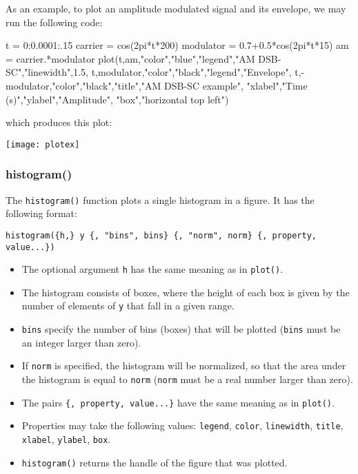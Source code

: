 \documentclass[11pt]{article}
\newcommand{\cmd}[1]{\texttt{#1}}
\begin{document}
As an example, to plot an amplitude modulated signal and its envelope, we may
run the following code:

\begin{juliacode}
t = 0:0.0001:.15
carrier = cos(2pi*t*200)
modulator = 0.7+0.5*cos(2pi*t*15)
am = carrier.*modulator
plot(t,am,"color","blue","legend","AM DSB-SC","linewidth",1.5,
    t,modulator,"color","black","legend","Envelope",
    t,-modulator,"color","black","title","AM DSB-SC example",
    "xlabel","Time (s)","ylabel","Amplitude",
    "box","horizontal top left")
\end{juliacode}

\noindent which produces this plot:

\begin{center}
\texttt{[image: plotex]}
\end{center}

\subsubsection{histogram()}

The \cmd{histogram()} function plots a single histogram in a figure. It has the
following format:

\cmd{histogram(\{h,\} y \{, "bins", bins\} \{, "norm", norm\}
\{, property, value...\})}

\begin{itemize}
	\item The optional argument \cmd{h} has the same meaning as in
		\cmd{plot()}.
	\item The histogram consists of boxes, where the height of each box is
		given by the number of elements of \cmd{y} that fall in a given range.
	\item \cmd{bins} specify the number of bins (boxes) that will be plotted
		(\cmd{bins} must be an integer larger than zero).
	\item If \cmd{norm} is specified, the histogram will be normalized, so that
		the area under the histogram is equal to \cmd{norm} (\cmd{norm} must be
		a real number larger than zero).
	\item The pairs \cmd{\{, property, value...\}} have the same meaning as in
		\cmd{plot()}.
	\item Properties may take the following values: \cmd{legend}, \cmd{color},
		\cmd{linewidth}, \cmd{title}, \cmd{xlabel}, \cmd{ylabel}, \cmd{box}.
	\item \cmd{histogram()} returns the handle of the figure that was plotted.
\end{itemize}
\end{document}
